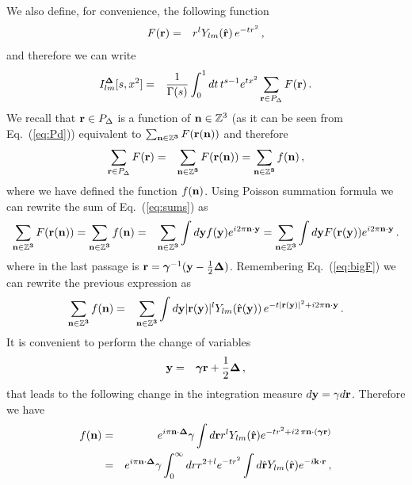 	We also define, for convenience, the following function 
	\begin{eqnarray}
	F({\bf r})&=&r^lY_{lm}(\hat{{\bf r}})\, e^{-tr^2}\, ,\label{eq:bigF}
	\end{eqnarray}
	and therefore we can write 
	\begin{eqnarray}
	I^{\bf\Delta}_{lm}[s,x^2]&=& \frac{1}{\Gamma(s)}\int_0^1dt\,t^{s-1}e^{tx^2}\sum_{{\bf r}\in P_\Delta }F({\bf r})\, .
	\end{eqnarray}
	We recall that ${\bf r}\in P_\Delta$ is a function of ${\bf n}\in\mathbb{Z}^3$ (as it can be seen from Eq.~(\ref{eq:Pd}))
	 equivalent to $\sum_{\bf n\in \mathbb{Z}^3}F({\bf r}({\bf n}))$ and therefore
	 \begin{eqnarray}
	 \sum_{{\bf r}\in P_\Delta }F({\bf r})&=&\sum_{\bf n\in \mathbb{Z}^3}F({\bf r}({\bf n}))=\sum_{\bf n\in \mathbb{Z}^3}f({\bf n})\, ,\label{eq:sums}
	 \end{eqnarray}
	 where we have defined the function $f({\bf n})$. 
	 Using Poisson summation formula we can rewrite the sum of Eq.~(\ref{eq:sums}) as
	\begin{eqnarray}
	\sum_{\bf n\in \mathbb{Z}^3}F({\bf r}({\bf n}))=\sum_{\bf n\in \mathbb{Z}^3}f({\bf n})&=&\sum_{\bf n\in \mathbb{Z}^3}\int d{\bf y}f({\bf y})e^{i2\pi{\bf n}\cdot{\bf y}}=\sum_{\bf n\in \mathbb{Z}^3}\int d{\bf y}F({\bf r}({\bf y}))e^{i2\pi{\bf n}\cdot{\bf y}}\, .
	\end{eqnarray}
	where in the last passage is ${\bf r}={\bm \gamma}^{-1}({\bf y}-\frac{1}{2}{\bf \Delta})$.
	Remembering Eq.~(\ref{eq:bigF}) we can rewrite the previous expression as
	\begin{eqnarray}
	\sum_{\bf n\in \mathbb{Z}^3}f({\bf n})&=&\sum_{\bf n\in \mathbb{Z}^3}\int d{\bf y}|{\bf r}({\bf y})|^lY_{lm}(\hat{{\bf r}}({\bf y}))\, e^{-t|{\bf r}({\bf y})|^2+i2\pi{\bf n}\cdot{\bf y}}\, .
	\end{eqnarray}
	It is convenient to 
	perform the change of variables
	\begin{eqnarray}
	{\bf y}&=&{\bm \gamma}{\bf r}+\frac{1}{2}{\bf \Delta}\, ,
	\end{eqnarray}
	that leads to the following change in the integration measure $d{\bf y}=\gamma d{\bf r}$.  Therefore we have
	\begin{eqnarray}
	f({\bf n})&=& e^{i\pi{\bf n}\cdot{\bf\Delta}}\gamma \int d{\bf r}r^lY_{lm}(\hat{\bf r})e^{-tr^2+i2\,\pi{\bf n}\cdot({\bm \gamma}{\bf r})}\nonumber\\
	&=& e^{i\pi{\bf n}\cdot{\bf\Delta}}\gamma \int_0^\infty dr r^{2+l} e^{-tr^2}\int d\hat{\bf r}Y_{lm}(\hat{\bf r})e^{-i{\bf k}\cdot{\bf r}}\, ,
	\end{eqnarray}
